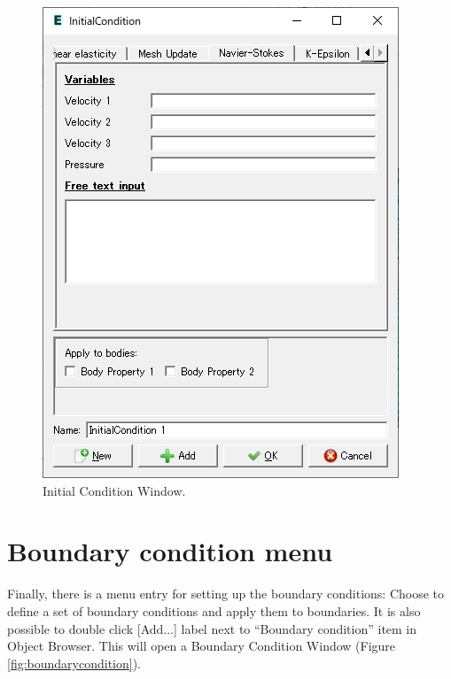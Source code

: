 \begin{figure}[htb]
\begin{center}
 \includegraphics[scale=0.5]{images/initialcondition.png}
\caption{Initial Condition Window.}
\label{fig:initialcondition}
\end{center}
\end{figure}

\section{Boundary condition menu}

Finally, there is a menu entry for setting up the boundary conditions:
\noindent Choose
\noindent to define a set of boundary conditions and apply them to boundaries. It is also possible to double click [Add...] label next to ``Boundary condition'' item in Object Browser. This will open a Boundary Condition Window (Figure \ref{fig:boundarycondition}). 

